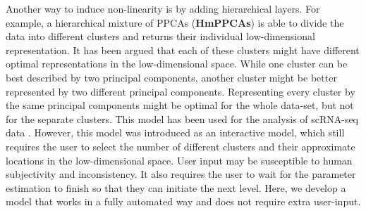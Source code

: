 Another way to induce non-linearity is by adding hierarchical layers. For example, a hierarchical mixture of PPCAs (\textbf{HmPPCAs}) \cite{bishop1998hierarchical} is able to divide the data into different clusters and returns their individual low-dimensional representation. It has been argued that each of these clusters might have different optimal representations in the low-dimensional space. While one cluster can be best described by two principal components, another cluster might be better represented by two different principal components. Representing every cluster by the same principal components might be optimal for the whole data-set, but not for the separate clusters. This model has been used for the analysis of scRNA-seq data \cite{philipsthesis}. However, this model was introduced as an interactive model, which still requires the user to select the number of different clusters and their approximate locations in the low-dimensional space. User input may be susceptible to human subjectivity and inconsistency. It also requires the user to wait for the parameter estimation to finish so that they can initiate the next level. Here, we develop a model that works in a fully automated way and does not require extra user-input.

